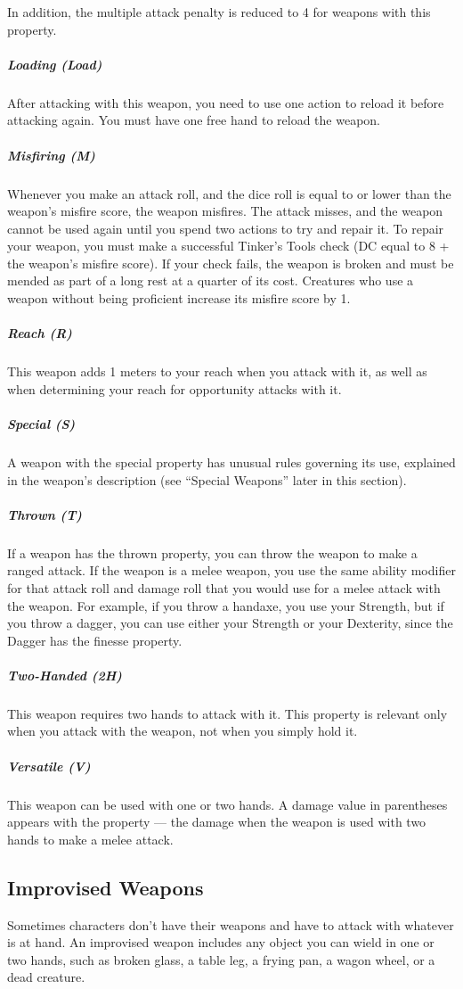         In addition, the multiple attack penalty is reduced to 4 for weapons with this property.
    \subparagraph{Loading (Load)}
        After attacking with this weapon, you need to use one action to reload it before attacking again.
        You must have one free hand to reload the weapon.
    \subparagraph{Misfiring (M)}
        Whenever you make an attack roll, and the dice roll is equal to or lower than the weapon’s misfire score, the weapon misfires.
        The attack misses, and the weapon cannot be used again until you spend two actions to try and repair it.
        To repair your weapon, you must make a successful Tinker’s Tools check (DC equal to 8 + the weapon's misfire score).
        If your check fails, the weapon is broken and must be mended as part of a long rest at a quarter of its cost.
        Creatures who use a weapon without being proficient increase its misfire score by 1.
    \subparagraph{Reach (R)}
        This weapon adds 1 meters to your reach when you attack with it, as well as when determining your reach for opportunity attacks with it.
    \subparagraph{Special (S)}
        A weapon with the special property has unusual rules governing its use, explained in the weapon’s description (see ``Special Weapons'' later in this section).
    \subparagraph{Thrown (T)}
        If a weapon has the thrown property, you can throw the weapon to make a ranged attack.
        If the weapon is a melee weapon, you use the same ability modifier for that attack roll and damage roll that you would use for a melee attack with the weapon.
        For example, if you throw a handaxe, you use your Strength, but if you throw a dagger, you can use either your Strength or your Dexterity, since the Dagger has the finesse property.
    \subparagraph{Two-Handed (2H)}
        This weapon requires two hands to attack with it.
        This property is relevant only when you attack with the weapon, not when you simply hold it.
    \subparagraph{Versatile (V)}
        This weapon can be used with one or two hands.
        A damage value in parentheses appears with the property --- the damage when the weapon is used with two hands to make a melee attack.
\subsection*{Improvised Weapons} \label{ssec::improvisedweapons}
    Sometimes characters don't have their weapons and have to attack with whatever is at hand.
    An improvised weapon includes any object you can wield in one or two hands, such as broken glass, a table leg, a frying pan, a wagon wheel, or a dead creature.

